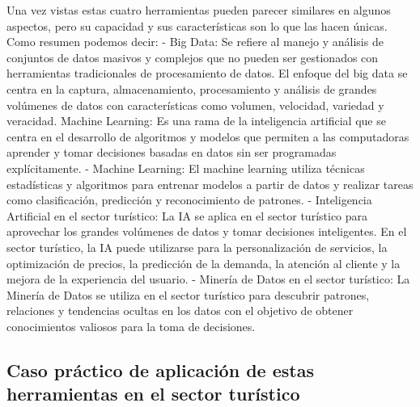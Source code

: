 \documentclass[
  letterpaper,
  DIV=11,
  numbers=noendperiod]{scrreprt}
\begin{document}
Una vez vistas estas cuatro herramientas pueden parecer similares en
algunos aspectos, pero su capacidad y sus características son lo que las
hacen únicas. Como resumen podemos decir: - Big Data: Se refiere al
manejo y análisis de conjuntos de datos masivos y complejos que no
pueden ser gestionados con herramientas tradicionales de procesamiento
de datos. El enfoque del big data se centra en la captura,
almacenamiento, procesamiento y análisis de grandes volúmenes de datos
con características como volumen, velocidad, variedad y veracidad.
Machine Learning: Es una rama de la inteligencia artificial que se
centra en el desarrollo de algoritmos y modelos que permiten a las
computadoras aprender y tomar decisiones basadas en datos sin ser
programadas explícitamente. - Machine Learning: El machine learning
utiliza técnicas estadísticas y algoritmos para entrenar modelos a
partir de datos y realizar tareas como clasificación, predicción y
reconocimiento de patrones. - Inteligencia Artificial en el sector
turístico: La IA se aplica en el sector turístico para aprovechar los
grandes volúmenes de datos y tomar decisiones inteligentes. En el sector
turístico, la IA puede utilizarse para la personalización de servicios,
la optimización de precios, la predicción de la demanda, la atención al
cliente y la mejora de la experiencia del usuario. - Minería de Datos en
el sector turístico: La Minería de Datos se utiliza en el sector
turístico para descubrir patrones, relaciones y tendencias ocultas en
los datos con el objetivo de obtener conocimientos valiosos para la toma
de decisiones.

\hypertarget{caso-pruxe1ctico-de-aplicaciuxf3n-de-estas-herramientas-en-el-sector-turuxedstico}{%
\subsection{Caso práctico de aplicación de estas herramientas en el
sector
turístico}\label{caso-pruxe1ctico-de-aplicaciuxf3n-de-estas-herramientas-en-el-sector-turuxedstico}}
\end{document}

